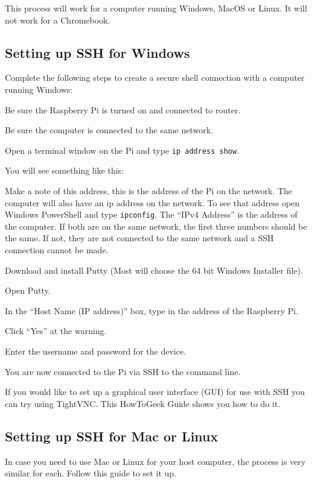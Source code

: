 \documentclass[
]{book}
\begin{document}
This process will work for a computer running Windows, MacOS or Linux. It will not work for a Chromebook.

\hypertarget{setting-up-ssh-for-windows}{%
\subsection{Setting up SSH for Windows}\label{setting-up-ssh-for-windows}}

Complete the following steps to create a secure shell connection with a computer running Windows:

Be sure the Raspberry Pi is turned on and connected to router.

Be sure the computer is connected to the same network.

Open a terminal window on the Pi and type \texttt{ip\ address\ show}.

You will see something like this:

Make a note of this address, this is the address of the Pi on the network. The computer will also have an ip address on the network. To see that address open Windows PowerShell and type \texttt{ipconfig}. The ``IPv4 Address'' is the address of the computer. If both are on the same network, the first three numbers should be the same. If not, they are not connected to the same network and a SSH connection cannot be made.

Download and install Putty (Most will choose the 64 bit Windows Installer file).

Open Putty.

In the ``Host Name (IP address)'' box, type in the address of the Raspberry Pi.

Click ``Yes'' at the warning.

Enter the username and password for the device.

You are now connected to the Pi via SSH to the command line.

If you would like to set up a graphical user interface (GUI) for use with SSH you can try using TightVNC. This HowToGeek Guide shows you how to do it.

\hypertarget{setting-up-ssh-for-mac-or-linux}{%
\subsection{Setting up SSH for Mac or Linux}\label{setting-up-ssh-for-mac-or-linux}}

In case you need to use Mac or Linux for your host computer, the process is very similar for each. Follow this guide to set it up.

  
\end{document}
